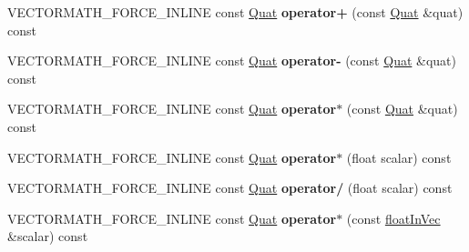 \begin{DoxyCompactItemize}
\item 
\mbox{\label{classVectormath_1_1Aos_1_1Quat_a32faa5172b2909acebcfbd31f080e9d4}} 
V\+E\+C\+T\+O\+R\+M\+A\+T\+H\+\_\+\+F\+O\+R\+C\+E\+\_\+\+I\+N\+L\+I\+NE const \hyperlink{classVectormath_1_1Aos_1_1Quat}{Quat} {\bfseries operator+} (const \hyperlink{classVectormath_1_1Aos_1_1Quat}{Quat} \&quat) const
\item 
\mbox{\label{classVectormath_1_1Aos_1_1Quat_aff5d738b547e37030d3ba2f6d77099d7}} 
V\+E\+C\+T\+O\+R\+M\+A\+T\+H\+\_\+\+F\+O\+R\+C\+E\+\_\+\+I\+N\+L\+I\+NE const \hyperlink{classVectormath_1_1Aos_1_1Quat}{Quat} {\bfseries operator-\/} (const \hyperlink{classVectormath_1_1Aos_1_1Quat}{Quat} \&quat) const
\item 
\mbox{\label{classVectormath_1_1Aos_1_1Quat_a51d154bfc8c0fb410c6c9bec7cd7bb63}} 
V\+E\+C\+T\+O\+R\+M\+A\+T\+H\+\_\+\+F\+O\+R\+C\+E\+\_\+\+I\+N\+L\+I\+NE const \hyperlink{classVectormath_1_1Aos_1_1Quat}{Quat} {\bfseries operator$\ast$} (const \hyperlink{classVectormath_1_1Aos_1_1Quat}{Quat} \&quat) const
\item 
\mbox{\label{classVectormath_1_1Aos_1_1Quat_af1a8a84ea7f40c6dae314ee81bb93a39}} 
V\+E\+C\+T\+O\+R\+M\+A\+T\+H\+\_\+\+F\+O\+R\+C\+E\+\_\+\+I\+N\+L\+I\+NE const \hyperlink{classVectormath_1_1Aos_1_1Quat}{Quat} {\bfseries operator$\ast$} (float scalar) const
\item 
\mbox{\label{classVectormath_1_1Aos_1_1Quat_a92841819b1f1e427dc6b163701c36c26}} 
V\+E\+C\+T\+O\+R\+M\+A\+T\+H\+\_\+\+F\+O\+R\+C\+E\+\_\+\+I\+N\+L\+I\+NE const \hyperlink{classVectormath_1_1Aos_1_1Quat}{Quat} {\bfseries operator/} (float scalar) const
\item 
\mbox{\label{classVectormath_1_1Aos_1_1Quat_a535f9dee238dff47a42f3c67086db36e}} 
V\+E\+C\+T\+O\+R\+M\+A\+T\+H\+\_\+\+F\+O\+R\+C\+E\+\_\+\+I\+N\+L\+I\+NE const \hyperlink{classVectormath_1_1Aos_1_1Quat}{Quat} {\bfseries operator$\ast$} (const \hyperlink{classVectormath_1_1floatInVec}{float\+In\+Vec} \&scalar) const
\item 
\mbox{\label{classVectormath_1_1Aos_1_1Quat_a3929cfe83d2017a0a0228d233901bb82}} 

\end{DoxyCompactItemize}
